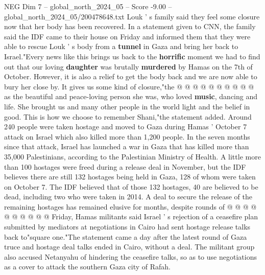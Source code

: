 \begin{textsample}{NEG Dim 7 – global\_north\_2024\_05 – Score -9.00 – global\_north\_2024\_05/200478648.txt}
Louk ' s family said they feel some closure now that her body has been recovered.
In a statement given to CNN, the family said the IDF came to their house on Friday and informed them that they were able to rescue Louk ' s body from a \textbf{tunnel} in Gaza and bring her back to Israel."Every news like this brings us back to the \textbf{horrific} moment we had to find out that our loving \textbf{daughter} was brutally \textbf{murdered} by Hamas on the 7th of October.
However, it is also a relief to get the body back and we are now able to bury her close by.
It gives us some kind of closure,"the @ @ @ @ @ @ @ @ @ @ as the beautiful and peace-loving person she was, who loved \textbf{music}, dancing and life.
She brought us and many other people in the world light and the belief in good.
This is how we choose to remember Shani,"the statement added.
Around 240 people were taken hostage and moved to Gaza during Hamas ' October 7 attack on Israel which also killed more than 1,200 people.
In the seven months since that attack, Israel has launched a war in Gaza that has killed more than 35,000 Palestinians, according to the Palestinian Ministry of Health.
A little more than 100 hostages were freed during a release deal in November, but the IDF believes there are still 132 hostages being held in Gaza, 128 of whom were taken on October 7.
The IDF believed that of those 132 hostages, 40 are believed to be dead, including two who were taken in 2014.
A deal to secure the release of the remaining hostages has remained elusive for months, despite rounds of @ @ @ @ @ @ @ @ @ @ Friday, Hamas militants said Israel ' s rejection of a ceasefire plan submitted by mediators at negotiations in Cairo had sent hostage release talks back to"square one."The statement came a day after the latest round of Gaza truce and hostage deal talks ended in Cairo, without a deal.
The militant group also accused Netanyahu of hindering the ceasefire talks, so as to use negotiations as a cover to attack the southern Gaza city of Rafah.

\end{textsample}
